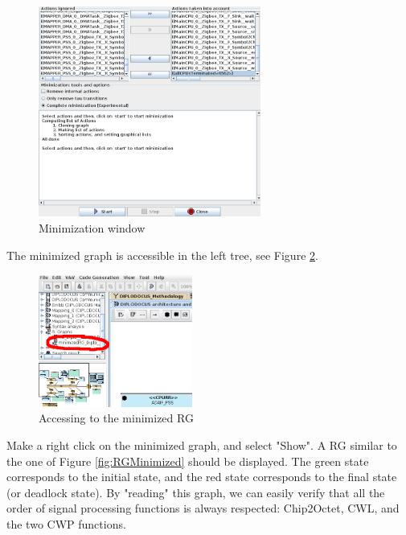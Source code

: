 \documentclass{llncs}
\begin{document}
\begin{itemize}
\begin{figure}[!htbp]
	\centering
	\includegraphics[width=0.65\textwidth]{figures/RGMinimizationWindow.png}
	\caption{Minimization window}
	\label{fig:RGMinimizationWindow}
\end{figure}

The minimized graph is accessible in the left tree, see Figure \ref{fig:RGMinimizedTree}. 

\begin{figure}[!htbp]
	\centering
	\includegraphics[width=0.45\textwidth]{figures/RGMinimizedTree.png}
	\caption{Accessing to the minimized RG}
	\label{fig:RGMinimizedTree}
\end{figure}

Make a right click on the minimized graph, and select "Show". A RG similar to the one of Figure \ref{fig:RGMinimized} should be displayed. The green state corresponds to the initial state, and the red state corresponds to the final state (or deadlock state). By "reading" this graph, we can easily verify that all the order of signal processing functions is always respected: Chip2Octet, CWL, and the two CWP functions.


\end{itemize}
\end{document}

